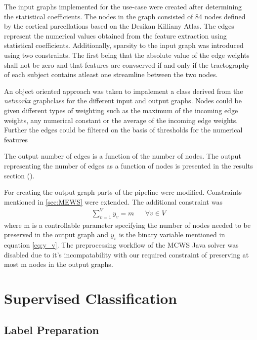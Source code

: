 \documentclass[msthesis.tex]{subfiles}
\begin{document}
The input graphs implemented for the use-case were created after determining the statistical coefficients. The nodes in the graph consisted of 84 nodes defined by the cortical parcellations based on the Desikan Killiany Atlas. The edges represent the numerical values obtained from the feature extraction using statistical coefficients. Additionally, sparsity to the input graph was introduced using two constraints. The first being that the absolute value of the edge weights shall not be zero and that features are convserved if and only if the tractography of each subject contains atleast one streamline between the two nodes. 

An object oriented approach was taken to impalement a class derived from the \textit{networkx} graphclass for the different input and output graphs. Nodes could be given different types of weighting such as the maximum of the incoming edge weights, any numerical constant or the average of the incoming edge weights. Further the edges could be filtered on the basis of thresholds for the numerical features 

The output number of edges is a function of the number of nodes. The output representing the number of edges as a function of nodes is presented in the results section (). 

For creating the output graph parts of the pipeline \cite{DBLP:journals/corr/LobodaAS16} were modified. Constraints mentioned in \ref{sec:MEWS} were extended. The additional constraint was 
\begin{align}
    \label{eq:sum_constraints}
    \sum_{v=1}^{V} y_v = m        &&  \forall v \in V
\end{align}
where m is a controllable parameter specifying the number of nodes needed to be preserved in the output graph and $y_v$ is the binary variable mentioned in equation \ref{eq:y_v}. The preprocessing workflow of the MCWS Java solver was disabled due to it's incompatability with our required constraint of preserving at most m nodes in the output graphs.


\section{Supervised Classification}

\subsection{Label Preparation}
\label{sec:label_preparation}
\end{document}
